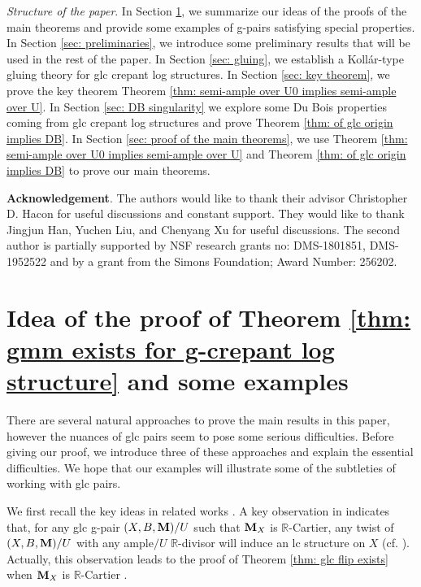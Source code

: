 \documentclass[11pt]{amsart}
\numberwithin{equation}{section}
\newcommand{\Mm}{{\bf{M}}}
\theoremstyle{definition}
\theoremstyle{definition}
\theoremstyle{definition}
\begin{document}
\medskip

\noindent\textit{Structure of the paper}. In Section \ref{sec: ideas}, we summarize our ideas of the proofs of the main theorems and provide some examples of g-pairs satisfying special properties. In Section \ref{sec: preliminaries}, we introduce some preliminary results that will be used in the rest of the paper. In Section \ref{sec: gluing}, we establish a Koll\'ar-type gluing theory for glc crepant log structures. In Section \ref{sec: key theorem}, we prove the key theorem Theorem \ref{thm: semi-ample over U0 implies semi-ample over U}. In Section \ref{sec: DB singularity} we explore some Du Bois properties coming from glc crepant log structures and prove Theorem \ref{thm: of glc origin implies DB}. In Section \ref{sec: proof of the main theorems}, we use Theorem \ref{thm: semi-ample over U0 implies semi-ample over U} and Theorem \ref{thm: of glc origin implies DB} to prove our main theorems.

\medskip

\noindent\textbf{Acknowledgement}. The authors would like to thank their advisor Christopher D. Hacon for useful discussions and constant support. They would like to thank Jingjun Han, Yuchen Liu, and Chenyang Xu for useful discussions. The second author is partially supported by NSF research grants no: DMS-1801851, DMS-1952522 and by a grant from the Simons Foundation; Award Number: 256202.

\section{Idea of the proof of Theorem \ref{thm: gmm exists for g-crepant log structure} and some examples}\label{sec: ideas}

There are several natural approaches to prove the main results in this paper, however the nuances of glc pairs seem to pose some serious difficulties. Before giving our proof, we introduce three of these approaches and explain the essential difficulties. We hope that our examples will illustrate some of the subtleties of working with glc pairs.


We first recall the key ideas in related works \cite{HL21a,LX22}. A key observation in \cite{HL21a} indicates that, for any glc g-pair $(X,B,\Mm)/U$ such that $\Mm_X$ is $\mathbb R$-Cartier, any twist of $(X,B,\Mm)/U$ with any ample$/U$ $\mathbb R$-divisor will induce an lc structure on $X$ (cf. \cite[Lemma 5.18]{HL21a}). Actually, this observation leads to the proof of Theorem \ref{thm: glc flip exists} when $\Mm_X$ is $\mathbb R$-Cartier \cite[Theorem 1.2]{HL21a}. 
 
\end{document}

